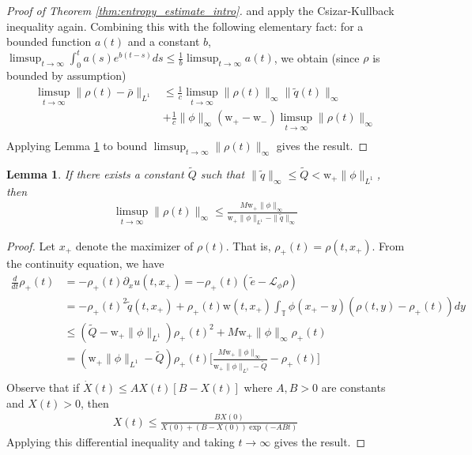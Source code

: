 \documentclass[11pt,letterpaper]{amsart}
\theoremstyle{plain}
\newtheorem{lemma}[THEOREM]{Lemma}
\theoremstyle{definition}
\theoremstyle{remark}
\newcommand{\T}{\ensuremath{\mathbb{T}}}   %
\def \cL {\mathcal{L}}
\renewcommand{\leq}{\leqslant}
\def\T{\mathbb{T}}
\def \wt {\mathrm{w}}
\begin{document}
\begin{proof}[Proof of Theorem \ref{thm:entropy_estimate_intro}]
    and apply the Csizar-Kullback inequality again.  Combining this with the following elementary fact: 
    for a bounded function $a(t)$ and a constant $b$, $\limsup_{t \to \infty} \int_0^t a(s) e^{b(t-s)} ds \leq \frac{1}{b} \limsup_{t \to \infty} a(t)$,
    we obtain (since $\rho$ is bounded by assumption)
    \begin{align*}
        \limsup_{t \to \infty} \|\rho(t) - \bar{\rho}\|_{L^1} 
            &\leq \frac{1}{c} \limsup_{t \to \infty} \|\rho(t)\|_{\infty} \|\tilde{q}(t)\|_{\infty} \\
            &+ \frac{1}{c} \|\phi\|_{\infty} (\wt_+ - \wt_-) \limsup_{t \to \infty} \|\rho(t)\|_{\infty} \\
    \end{align*}
    Applying Lemma \ref{lma:bd_on_rho} to bound $\limsup_{t \to \infty} \|\rho(t)\|_{\infty}$ gives the result.  
\end{proof}

\begin{lemma}
    \label{lma:bd_on_rho}
    If there exists a constant $\tilde{Q}$ such that $\|\tilde{q}\|_{\infty} \leq \tilde{Q} < \wt_+ \|\phi\|_{L^1}$, then 
    \begin{align*}
        \limsup_{t \to \infty} \|\rho(t)\|_{\infty} \leq \frac{M \wt_+ \|\phi\|_{\infty}}{\wt_+ \|\phi\|_{L^1} - \|\tilde{q}\|_{\infty}}
    \end{align*}
\end{lemma}
\begin{proof}
    Let $x_+$ denote the maximizer of $\rho(t)$. That is, $\rho_+(t) = \rho(t, x_+)$. From the continuity equation, we have 
    \begin{align*}
        \frac{d}{dt} \rho_+(t) 
            &= -\rho_+(t) \partial_x u(t, x_+) = -\rho_+(t) (\tilde{e} - \cL_{\phi} \rho) \\
            &= -\rho_+(t)^2 \tilde{q}(t, x_+) + \rho_+(t) \wt(t, x_+) \int_{\T} \phi(x_+ - y) (\rho(t,y) - \rho_+(t)) dy \\
            &\leq  (\tilde{Q} - \wt_+ \|\phi\|_{L^1}) \rho_+(t)^2 + M \wt_+ \|\phi\|_{\infty} \rho_+(t) \\
            &=  (\wt_+ \|\phi\|_{L^1} - \tilde{Q}) \rho_+(t) \bigg[ \frac{M \wt_+ \|\phi\|_{\infty}}{\wt_+ \|\phi\|_{L^1} - \tilde{Q}} - \rho_+(t) \bigg] \\
    \end{align*}
    Observe that if $\dot{X}(t) \leq A X(t) [B - X(t)]$ where $A,B > 0$ are constants and $X(t) > 0$, 
    then 
    \begin{align*}
        X(t) \leq \frac{BX(0)} {X(0) + (B - X(0)) \exp(-ABt)}
    \end{align*}
    Applying this differential inequality and taking $t \to \infty$ gives the result. 
\end{proof}
\end{document}
